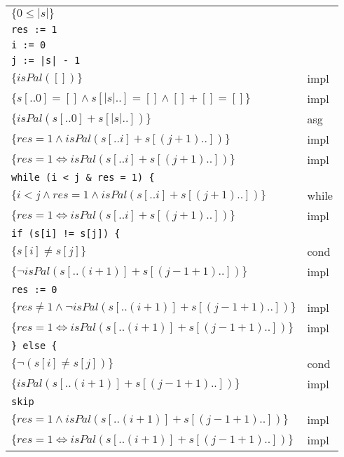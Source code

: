 \documentclass[12pt]{article}
\begin{document}
\begin{center}
    \begin{tabular}{ll}
        $\{ 0 \le |s| \}$ & \\
        {\color{gray} \texttt{res := 1}} & \\
        {\color{gray} \texttt{i := 0}} & \\
        {\color{gray} \texttt{j := |s| - 1}} & \\
        $\{ isPal([]) \}$ & impl \\
        $\{ s[..0] = [] \wedge s[|s|..] = [] \wedge [] + [] = [] \}$ & impl \\
        $\{ isPal(s[..0] + s[|s|..]) \}$ & asg \\
        $\{ res = 1 \wedge isPal(s[..i] + s[(j + 1)..]) \}$ & impl \\
        $\{ res = 1 \Leftrightarrow isPal(s[..i] + s[(j + 1)..]) \}$ & impl \\
        {\color{gray} \texttt{while (i < j \& res = 1) \{}} & \\
        \qquad $\{ i < j \wedge res = 1 \wedge isPal(s[..i] + s[(j + 1)..]) \}$ & while \\
        \qquad $\{ res = 1 \Leftrightarrow isPal(s[..i] + s[(j + 1)..]) \}$ & impl \\
        {\color{gray} \qquad \texttt{if (s[i] != s[j]) \{}} & \\
        \qquad \qquad $\{ s[i] \neq s[j] \}$ & cond \\
        \qquad \qquad $\{ \neg isPal(s[..(i + 1)] + s[(j - 1 + 1)..]) \}$ & impl \\
        {\color{gray} \qquad \qquad \texttt{res := 0}} & \\
        \qquad \qquad $\{ res \neq 1 \wedge \neg isPal(s[..(i + 1)] + s[(j - 1 + 1)..]) \}$ & impl \\
        \qquad \qquad $\{ res = 1 \Leftrightarrow isPal(s[..(i + 1)] + s[(j - 1 + 1)..]) \}$ & impl \\
        {\color{gray} \qquad \texttt{\} else \{}} & \\
        \qquad \qquad $\{ \neg (s[i] \neq s[j]) \}$ & cond \\
        \qquad \qquad $\{ isPal(s[..(i + 1)] + s[(j - 1 + 1)..]) \}$ & impl \\
        {\color{gray} \qquad \qquad \texttt{skip}} & \\
        \qquad \qquad $\{ res = 1 \wedge isPal(s[..(i + 1)] + s[(j - 1 + 1)..]) \}$ & impl \\
        \qquad \qquad $\{ res = 1 \Leftrightarrow isPal(s[..(i + 1)] + s[(j - 1 + 1)..]) \}$ & impl \\

\end{tabular}
\end{center}
\end{document}
